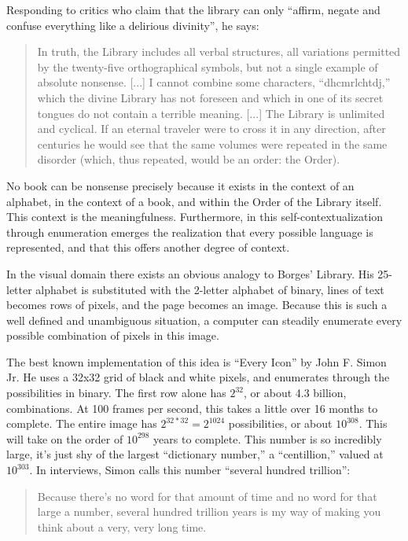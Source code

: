 \documentclass{thesis}
\begin{document}
	Responding to critics who claim that the library can only ``affirm, negate and confuse everything like a delirious divinity'', he says:
	
	\begin{quote}
	In truth, the Library includes all verbal structures, all variations permitted by the twenty-five orthographical symbols, but not a single example of absolute nonsense. [...] I cannot combine some characters, ``dhcmrlchtdj,'' which the divine Library has not foreseen and which in one of its secret tongues do not contain a terrible meaning. [...] The Library is unlimited and cyclical. If an eternal traveler were to cross it in any direction, after centuries he would see that the same volumes were repeated in the same disorder (which, thus repeated, would be an order: the Order).
	\end{quote}
	
	No book can be nonsense precisely because it exists in the context of an alphabet, in the context of a book, and within the Order of the Library itself. This context is the meaningfulness. Furthermore, in this self-contextualization through enumeration emerges the realization that every possible language is represented, and that this offers another degree of context.
	
	In the visual domain there exists an obvious analogy to Borges' Library. His 25-letter alphabet is substituted with the 2-letter alphabet of binary, lines of text becomes rows of pixels, and the page becomes an image. Because this is such a well defined and unambiguous situation, a computer can steadily enumerate every possible combination of pixels in this image.
	
	The best known implementation of this idea is ``Every Icon'' by John F. Simon Jr.\cite{john_f._simon_jr._every_????} He uses a 32x32 grid of black and white pixels, and enumerates through the possibilities in binary. The first row alone has $2^{32}$, or about 4.3 billion, combinations. At 100 frames per second, this takes a little over 16 months to complete. The entire image has $2^{32*32}=2^{1024}$ possibilities, or about $10^{308}$. This will take on the order of $10^{298}$ years to complete. This number is so incredibly large, it's just shy of the largest ``dictionary number,'' a ``centillion,'' valued at $10^{303}$. In interviews, Simon calls this number ``several hundred trillion''\cite{matthew_mirapaul_in_1997}:
	
	\begin{quote}
	Because there's no word for that amount of time and no word for that large a number, several hundred trillion years is my way of making you think about a very, very long time.
	\end{quote}
	
\end{document}
